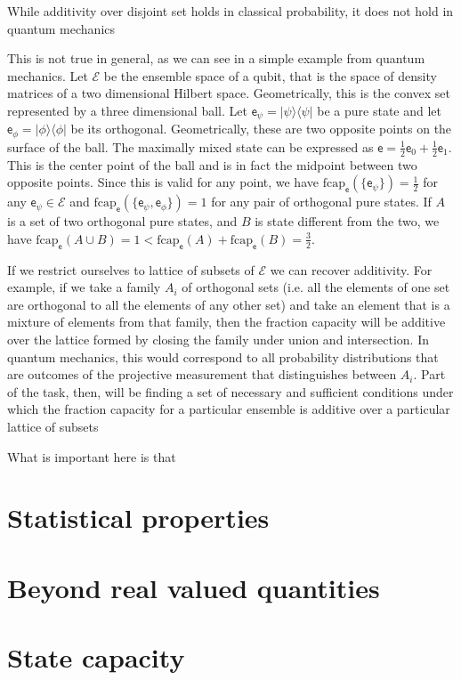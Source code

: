 \documentclass[10pt,twocolumn, nofootinbib]{revtex4-2}
\newcommand\frcap{\mathrm{fcap}}
\newcommand{\ens}[1][e] {\mathsf{#1}} %
\newcommand{\Ens}[1][E] {\mathcal{#1}} %
\def\>{\rangle}
\def\<{\langle}
\begin{document}
While additivity over disjoint set holds in classical probability, it does not hold in quantum mechanics

 This is not true in general, as we can see in a simple example from quantum mechanics. Let $\Ens$ be the ensemble space of a qubit, that is the space of density matrices of a two dimensional Hilbert space. Geometrically, this is the convex set represented by a three dimensional ball. Let $\ens_{\psi} = |\psi\>\<\psi|$ be a pure state and let $\ens_{\phi} = |\phi\>\<\phi|$ be its orthogonal. Geometrically, these are two opposite points on the surface of the ball. The maximally mixed state can be expressed as $\ens = \frac{1}{2} \ens_0 + \frac{1}{2} \ens_1$. This is the center point of the ball and is in fact the midpoint between two opposite points. Since this is valid for any point, we have $\frcap_{\ens}(\{\ens_{\psi}\})=\frac{1}{2}$ for any $\ens_{\psi} \in \Ens$ and $\frcap_{\ens}(\{\ens_{\psi}, \ens_{\phi}\})=1$ for any pair of orthogonal pure states. If $A$ is a set of two orthogonal pure states, and $B$ is state different from the two, we have $\frcap_{\ens}(A \cup B) = 1 < \frcap_{\ens}(A) + \frcap_{\ens}(B) = \frac{3}{2}$.

If we restrict ourselves to lattice of subsets of $\Ens$ we can recover additivity. For example, if we take a family $A_i$ of orthogonal sets (i.e. all the elements of one set are orthogonal to all the elements of any other set) and take an element that is a mixture of elements from that family, then the fraction capacity will be additive over the lattice formed by closing the family under union and intersection. In quantum mechanics, this would correspond to all probability distributions that are outcomes of the projective measurement that distinguishes between $A_i$. Part of the task, then, will be finding a set of necessary and sufficient conditions under which the fraction capacity for a particular ensemble is additive over a particular lattice of subsets

What is important here is that 


\section{Statistical properties}

\section{Beyond real valued quantities}


\section{State capacity}
\end{document}
